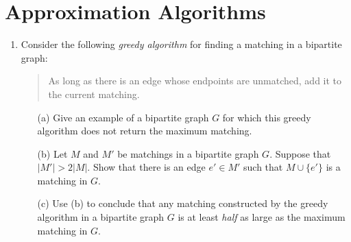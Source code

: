 \documentclass[12pt]{article}
\begin{document}
\begin{enumerate}
{}





\end{enumerate}

\section{Approximation Algorithms}


\begin{enumerate}


\item

Consider the following {\em greedy algorithm} for finding
a matching in a bipartite graph:
\begin{quote}
As long as there is an edge whose endpoints are unmatched,
add it to the current matching.
\end{quote}
\begin{itemize}
\item[(a)] Give an example of a bipartite graph $G$
for which this greedy algorithm does not return
the maximum matching.
\item[(b)] Let $M$ and $M'$ be matchings in a bipartite graph $G$.
Suppose that $|M'| > 2 |M|$.  Show that there is an edge
$e' \in M'$ such that $M \cup \{e'\}$ is a matching in $G$.
\item[(c)] Use (b) to conclude that any matching constructed
by the greedy algorithm in a bipartite graph $G$
is at least {\em half} as large as the maximum matching in $G$.
\end{itemize}

\end{enumerate}
\end{document}
